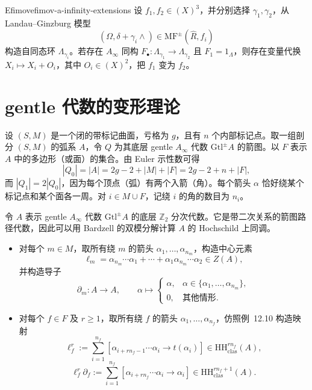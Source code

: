 \begin{theorem}{Efimov}{efimov-a-infinity-extensions}
设 $f_1,f_2\in(X)^3$，并分别选择 $\gamma_1,\gamma_2$，从 Landau--Ginzburg 模型
\[
  (\Omega,\delta+\gamma_i\wedge)\in\mathrm{MF}^{\pm}(\widehat R,f_i)
\]
构造自同态环 $\Lambda_{\gamma_i}$。若存在 $A_\infty$ 同构 $F_{\bullet}:\Lambda_{\gamma_1}\to\Lambda_{\gamma_2}$ 且 $F_1=1_\Lambda$，则存在变量代换 $X_i\mapsto X_i+O_i$，其中 $O_i\in(X)^2$，把 $f_1$ 变为 $f_2$。
\end{theorem}

\section{gentle 代数的变形理论}\label{sec:gentle-algebra-deformations}

设 $(S,M)$ 是一个闭的带标记曲面，亏格为 $g$，且有 $n$ 个内部标记点。取一组剖分 $(S,M)$ 的弧系 $A$，令 $Q$ 为其底层 gentle $A_\infty$ 代数 $\mathrm{Gtl}^{\pm}A$ 的箭图。以 $F$ 表示 $A$ 中的多边形（或面）的集合。由 Euler 示性数可得
\[
  |Q_0|=|A|=2g-2+|M|+|F|=2g-2+n+|F|,
\]
而 $|Q_1|=2|Q_0|$，因为每个顶点（弧）有两个入箭（角）。每个箭头 $\alpha$ 恰好绕某个标记点和某个面各一周。对 $i\in M\cup F$，记绕 $i$ 的角的数目为 $n_i$。

令 $A$ 表示 gentle $A_\infty$ 代数 $\mathrm{Gtl}^{\pm}A$ 的底层 $\mathbb Z_2$ 分次代数。它是带二次关系的箭图路径代数，因此可以用 Bardzell 的双模分解计算 $A$ 的 Hochschild 上同调。

\begin{itemize}
  \item 对每个 $m\in M$，取所有绕 $m$ 的箭头 $\alpha_1,\ldots,\alpha_{n_m}$，构造中心元素
  \[
    \ell_m=\alpha_{n_m}\cdots\alpha_1+\cdots+\alpha_1\alpha_{n_m}\cdots\alpha_2\in Z(A),
  \]
  并构造导子
  \[
    \partial_m:A\to A,\qquad
    \alpha\longmapsto\begin{cases}
      \alpha,&\alpha\in\{\alpha_1,\ldots,\alpha_{n_m}\},\\
      0,&\text{其他情形}.
    \end{cases}
  \]
  \item 对每个 $f\in F$ 及 $r\geq1$，取所有绕 $f$ 的箭头 $\alpha_1,\ldots,\alpha_{n_f}$，仿照例~12.10 构造映射
  \[
    \ell_f^r:=\sum_{i=1}^{n_f}[\alpha_{i+rn_f-1}\cdots\alpha_i\to t(\alpha_i)]
      \in\mathrm{HH}^{rn_f}_{\mathrm{clas}}(A),
  \]
  \[
    \ell_f^r\partial_f:=\sum_{i=1}^{n_f}[\alpha_{i+rn_f}\cdots\alpha_i\to\alpha_i]
      \in\mathrm{HH}^{rn_f+1}_{\mathrm{clas}}(A).
  \]
\end{itemize}

